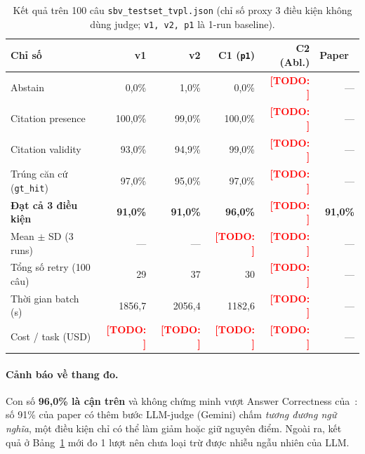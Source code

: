 \documentclass[sigconf,nonacm]{acmart}
\newcommand{\TODO}[1]{\textcolor{red}{\textbf{[TODO: #1]}}}
\begin{document}
\begin{table}[t]
\caption{Kết quả trên 100 câu \texttt{sbv\_testset\_tvpl.json} (chỉ số proxy 3 điều kiện không dùng judge; \texttt{v1, v2, p1} là 1-run baseline).}
\label{tab:main}
\scriptsize
\begin{tabular}{@{}lrrrrr@{}}
\toprule
\textbf{Chỉ số} & \textbf{v1} & \textbf{v2} & \textbf{C1 (\texttt{p1})} & \textbf{C2 (Abl.)} & \textbf{Paper~\cite{phan2026sbv}} \\
\midrule
Abstain             & 0,0\%  & 1,0\%  & 0,0\%  & \TODO{} & --- \\
Citation presence   & 100,0\% & 99,0\% & 100,0\% & \TODO{} & --- \\
Citation validity   & 93,0\% & 94,9\% & 99,0\% & \TODO{} & --- \\
Trúng căn cứ (\texttt{gt\_hit}) & 97,0\% & 95,0\% & 97,0\% & \TODO{} & --- \\
\textbf{Đạt cả 3 điều kiện} & \textbf{91,0\%} & \textbf{91,0\%} & \textbf{96,0\%} & \TODO{} & \textbf{91,0\%} \\
\midrule
Mean $\pm$ SD (3 runs) & --- & --- & \TODO{} & \TODO{} & --- \\
Tổng số retry (100 câu) & 29 & 37 & 30 & \TODO{} & --- \\
Thời gian batch (s) & 1856,7 & 2056,4 & 1182,6 & \TODO{} & --- \\
Cost / task (USD) & \TODO{} & \TODO{} & \TODO{} & \TODO{} & --- \\
\bottomrule
\end{tabular}
\end{table}

\paragraph{Cảnh báo về thang đo.} Con số \textbf{96,0\% là cận trên} và không chứng minh vượt Answer Correctness của~\cite{phan2026sbv}: số 91\% của paper có thêm bước LLM-judge (Gemini) chấm \emph{tương đương ngữ nghĩa}, một điều kiện chỉ có thể làm giảm hoặc giữ nguyên điểm. Ngoài ra, kết quả ở Bảng~\ref{tab:main} mới đo 1 lượt nên chưa loại trừ được nhiễu ngẫu nhiên của LLM.
\end{document}
